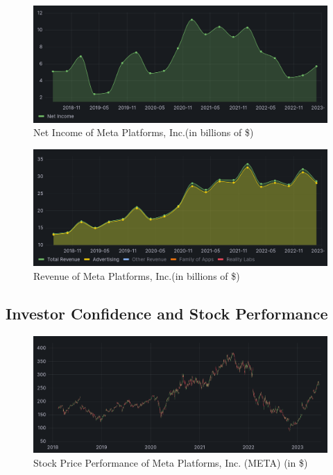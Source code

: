 \documentclass[12pt, a4paper]{article}
\begin{document}
\begin{figure}[H]
    \centering
    \includegraphics[width=1.00\textwidth]{net-income}
    \caption{Net Income of Meta Platforms, Inc.(in billions of
    \$)\cite{2023q1,2020q4,2020q3,2020q2,2020q1,2019q4,2019q3,2019q2,2019q1,2018q4,2018q3,2018q2}}
    \label{fig:net-income}
\end{figure}

\begin{figure}[H]
    \centering
    \includegraphics[width=1.00\textwidth]{revenue}
    \caption{Revenue of Meta Platforms, Inc.(in billions of
    \$)\cite{2023q1,2020q4,2020q3,2020q2,2020q1,2019q4,2019q3,2019q2,2019q1,2018q4,2018q3,2018q2}}
    \label{fig:revenue}
\end{figure}

\subsection*{Investor Confidence and Stock Performance}

\begin{figure}[H]
    \centering
    \includegraphics[width=1.00\textwidth]{stock-price}
    \caption{Stock Price Performance of Meta Platforms, Inc. (META) (in
    \$)\cite{stockPrice}}
    \label{fig:stock-price}
\end{figure}
\end{document}
